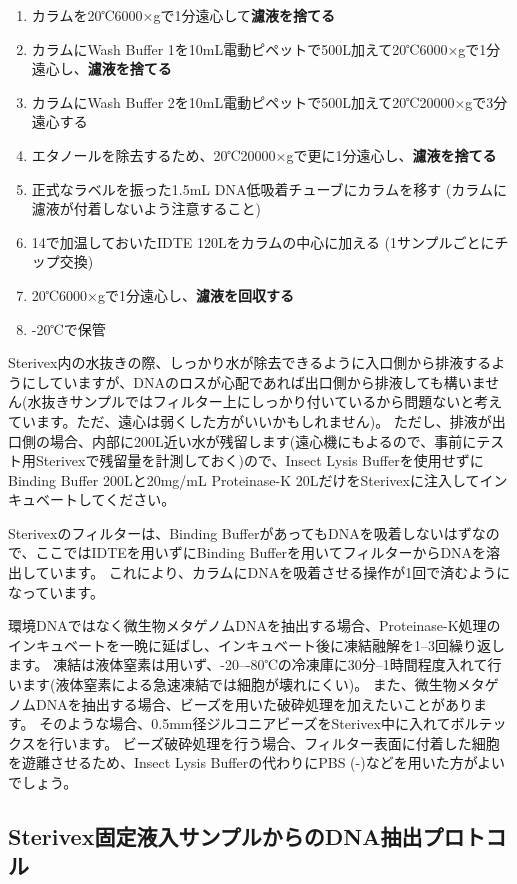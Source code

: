 \documentclass[titlepage,10pt,a4paper]{jsbook}
\begin{document}
\begin{enumerate}
\item カラムを20℃6000×gで1分遠心して\textbf{濾液を捨てる}
\item カラムにWash Buffer 1を10mL電動ピペットで500{\textmu}L加えて20℃6000×gで1分遠心し、\textbf{濾液を捨てる}
\item カラムにWash Buffer 2を10mL電動ピペットで500{\textmu}L加えて20℃20000×gで3分遠心する
\item エタノールを除去するため、20℃20000×gで更に1分遠心し、\textbf{濾液を捨てる}
\item 正式なラベルを振った1.5mL DNA低吸着チューブにカラムを移す (カラムに濾液が付着しないよう注意すること)
\item 14で加温しておいたIDTE 120{\textmu}Lをカラムの中心に加える (1サンプルごとにチップ交換)
\item 20℃6000×gで1分遠心し、\textbf{濾液を回収する}
\item -20℃で保管
\end{enumerate}

Sterivex内の水抜きの際、しっかり水が除去できるように入口側から排液するようにしていますが、DNAのロスが心配であれば出口側から排液しても構いません(水抜きサンプルではフィルター上にしっかり付いているから問題ないと考えています。ただ、遠心は弱くした方がいいかもしれません)。
ただし、排液が出口側の場合、内部に200{\textmu}L近い水が残留します(遠心機にもよるので、事前にテスト用Sterivexで残留量を計測しておく)ので、Insect Lysis Bufferを使用せずにBinding Buffer 200{\textmu}Lと20mg/mL Proteinase-K 20{\textmu}LだけをSterivexに注入してインキュベートしてください。

Sterivexのフィルターは、Binding BufferがあってもDNAを吸着しないはずなので、ここではIDTEを用いずにBinding Bufferを用いてフィルターからDNAを溶出しています。
これにより、カラムにDNAを吸着させる操作が1回で済むようになっています。

環境DNAではなく微生物メタゲノムDNAを抽出する場合、Proteinase-K処理のインキュベートを一晩に延ばし、インキュベート後に凍結融解を1--3回繰り返します。
凍結は液体窒素は用いず、{-20}--{-80}℃の冷凍庫に30分--1時間程度入れて行います(液体窒素による急速凍結では細胞が壊れにくい)。
また、微生物メタゲノムDNAを抽出する場合、ビーズを用いた破砕処理を加えたいことがあります。
そのような場合、0.5mm径ジルコニアビーズをSterivex中に入れてボルテックスを行います\citep{Ushio2019}。
ビーズ破砕処理を行う場合、フィルター表面に付着した細胞を遊離させるため、Insect Lysis Bufferの代わりにPBS (-)などを用いた方がよいでしょう。

\subsection{Sterivex固定液入サンプルからのDNA抽出プロトコル}
\end{document}
